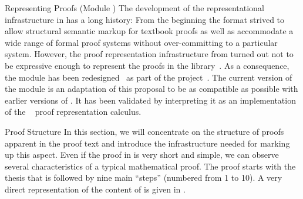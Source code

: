\begin{tchapter}[id=proofs,short=Representing Proofs]{Representing Proofs (Module {})}
The development of the representational infrastructure in {\omdoc} has a long history:
From the beginning the format strived to allow structural semantic markup for textbook
proofs as well as accommodate a wide range of formal proof systems without over-committing
to a particular system. However, the proof representation infrastructure from
{} turned out not to be expressive enough to represent the proofs in the
{} library~\cite{AspPad:hsmw01}. As a consequence, the {} module
has been redesigned~\cite{AspKohSac:dtdop03} as part of the {}
project~\cite{AspKoht:mimp02}.  The current version of the {} module is an
adaptation of this proposal to be as compatible as possible with earlier versions of
{\omdoc}. It has been validated by interpreting it as an implementation of the
{}~\cite{SacerdotiCoen:enlt05} proof
representation calculus.

\begin{tsection}[id=proof-text]{Proof Structure}
  In this section, we will concentrate on the structure of proofs apparent in the proof
  text and introduce the {\omdoc} infrastructure needed for marking up this aspect. Even
  if the proof in {} is very short and simple, we can observe
  several characteristics of a typical mathematical proof.  The proof starts with the
  thesis that is followed by nine main ``steps'' (numbered from 1 to 10). A very direct
  representation of the content of {} is given in
  {}.


\end{tsection}
\end{tchapter}
